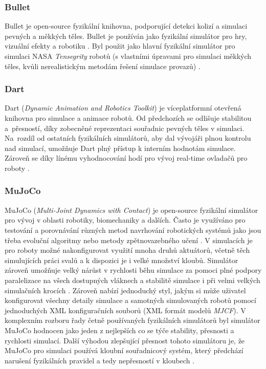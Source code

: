\subsubsection{Bullet} \label{Bullet}
Bullet je open-source fyzikální knihovna, podporující detekci kolizí a simulaci
pevných a měkkých těles. Bullet je používán jako fyzikální simulátor pro hry,
vizuální efekty a robotiku \citep{coumans}. Byl použit jako hlavní fyzikální
simulátor pro simulaci NASA \emph{Tensegrity} robotů (s vlastními úpravami pro
simulaci měkkých těles, kvůli nerealistickým metodám řešení simulace provazů)
\citep{izadi2018simulating}.

\subsubsection{Dart} \label{Dart}
Dart (\emph{Dynamic Animation and Robotics Toolkit}) je víceplatformní otevřená
knihovna pro simulace a animace robotů. Od předchozích se odlišuje stabilitou
a~přesností, díky zobecněné reprezentaci souřadnic pevných těles v simulaci.
Na~rozdíl od ostatních fyzikálních simulátorů, aby dal vývojáři plnou kontrolu
nad simulací, umožňuje Dart plný přístup k interním hodnotám simulace. Zároveň
se díky línému vyhodnocování hodí pro vývoj real-time ovladačů pro roboty
\citep{lee2018dart}.

\subsubsection{MuJoCo} \label{MuJoCo}
MuJoCo (\emph{Multi-Joint Dynamics with Contact}) \citep{deepmind_2021} je
open-source fyzikální simulátor pro vývoj v oblasti robotiky, biomechaniky a
dalších. Často je využíváno pro testování a porovnávání různých metod
navrhování robotických systémů jako jsou třeba evoluční algoritmy nebo metody
zpětnovazebného učení \citep{salimans2017evolution}. V simulacích je pro roboty
možné nakonfigurovat využití mnoha druhů aktuátorů, včetně těch simulujících
práci svalů a k dispozici je i velké množství kloubů. Simulátor zároveň
umožňuje velký nárůst v rychlosti běhu simulace za pomoci plné podpory
paralelizace na všech dostupných vláknech a stabilitě simulace i při velmi
velkých simulačních krocích \citep{todorov2012mujoco}. Zároveň nabízí
jednoduchý styl, jakým si může uživatel konfigurovat všechny detaily simulace a
samotných simulovaných robotů pomocí jednoduchých XML konfiguračních souborů
(XML formát modelů \emph{MJCF}). V komplexním rozboru řady četně používaných
fyzikálních simulátorů byl simulátor MuJoCo hodnocen jako jeden z nejlepších co
se týče stability, přesnosti a rychlosti simulací. Další výhodou zlepšující
přesnost tohoto simulátoru je, že MuJoCo pro simulaci používá kloubní
souřadnicový systém, který předchází narušení fyzikálních pravidel a tedy
nepřesností v kloubech \citep{erez2015simulation}.


